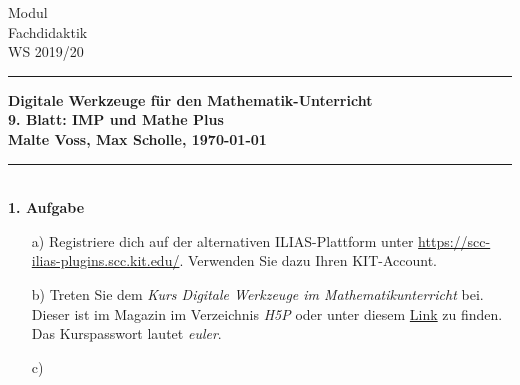 \documentclass[a4paper,11pt]{scrreprt} %
\theoremstyle{definition} %
\begin{document}
%
\hfill \parbox{22mm}
{ 
Modul \\ Fachdidaktik \\ WS 2019/20 
}

\rule{\textwidth}{1pt}                                   %
%
\begin{center}
\textbf{
Digitale Werkzeuge für den Mathematik-Unterricht \\[1ex] %
%
{
\Large 9. Blatt:  \glqq IMP und Mathe Plus\grqq } \\[1ex]
%
%
Malte Voss, Max Scholle, \today
}
\end{center}
% 
\rule{\textwidth}{1pt}\\                                 %
 
\textbf{1. Aufgabe}
\begin{enumerate}
    \item[a)] 
        Registriere dich auf der alternativen ILIAS-Plattform unter
        \url{https://scc-ilias-plugins.scc.kit.edu/}. 
        Verwenden Sie dazu Ihren KIT-Account.

    \item[b)]
        Treten Sie dem \emph{Kurs Digitale Werkzeuge im Mathematikunterricht} bei.
        Dieser ist im Magazin im Verzeichnis \emph{H5P} oder unter diesem 
        \href{https://scc-ilias-plugins.scc.kit.edu/goto.php?target=crs_5451&client_id=pilot}{Link}
        zu finden.
        Das Kurspasswort lautet \emph{euler}.

    \item[c)]
\end{enumerate}
%

\vspace{3ex}



\end{document}
